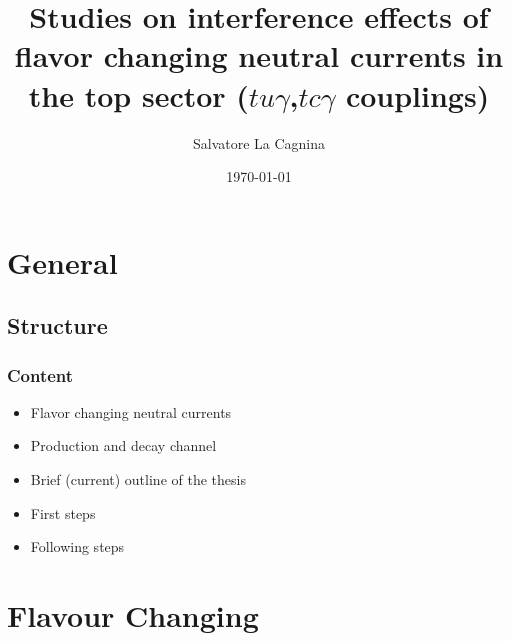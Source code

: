\documentclass{beamer}
\title{Studies on interference effects of flavor changing neutral currents in the top sector ($tu\gamma$,$tc\gamma$ couplings)}
\author{Salvatore La Cagnina}
\institute[TU Dortmund]{
\scriptsize Technische Universität Dortmund, Lehrstuhl EIV \\ 
\vspace{0.5cm}
}
\date{\today}
\begin{document}
\frame{\titlepage}





\section{General}
\subsection{Structure}
\begin{frame}[fragile]
\frametitle{Content}
	\begin{itemize}
		\item Flavor changing neutral currents
		\item Production and decay channel
		\item Brief (current) outline of the thesis
		\item First steps
		\item Following steps
	\end{itemize}
\end{frame}


\section{Flavour Changing}
\end{document}

